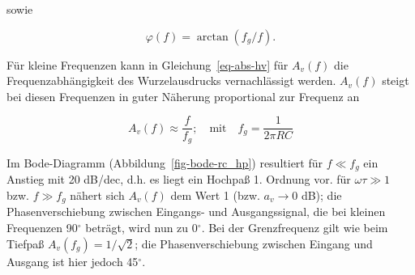 \documentclass[
  ngerman,
  letterpaper,
]{scrbook}
\begin{document}
sowie

\[
\varphi(f) = \arctan(f_g/f).
\]

Für kleine Frequenzen kann in Gleichung~\ref{eq-abs-hv} für \(A_v(f)\)
die Frequenzabhängigkeit des Wurzelausdrucks vernachlässigt werden.
\(A_v(f)\) steigt bei diesen Frequenzen in guter Näherung proportional
zur Frequenz an

\[
A_v(f) \approx \frac{f}{f_g}; \quad \text{mit} \quad f_g = \frac{1}{2\pi RC}
\]

Im Bode-Diagramm (Abbildung~\ref{fig-bode-rc_hp}) resultiert für
\(f \ll f_g\) ein Anstieg mit 20 dB/dec, d.h. es liegt ein Hochpaß 1.
Ordnung vor. für \(\omega \tau \gg 1\) bzw. \(f \gg f_g\) nähert sich
\(A_v(f)\) dem Wert 1 (bzw. \(a_v \rightarrow 0\) dB); die
Phasenverschiebung zwischen Eingangs- und Ausgangssignal, die bei
kleinen Frequenzen 90\(^{\circ}\) beträgt, wird nun zu 0\(^{\circ}\).
Bei der Grenzfrequenz gilt wie beim Tiefpaß \(A_v(f_g) = 1/\sqrt{2}\);
die Phasenverschiebung zwischen Eingang und Ausgang ist hier jedoch
45\(^{\circ}\).
\end{document}
